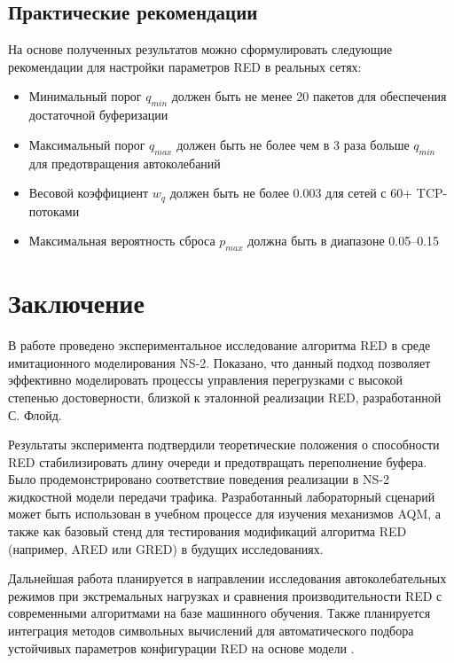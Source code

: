 \documentclass[10pt, conference, twocolumn, a4paper]{article}
\begin{document}
\subsection{Практические рекомендации}
На основе полученных результатов можно сформулировать следующие рекомендации для настройки параметров RED в реальных сетях:
\begin{itemize}
    \item Минимальный порог $q_{min}$ должен быть не менее 20 пакетов для обеспечения достаточной буферизации
    \item Максимальный порог $q_{max}$ должен быть не более чем в 3 раза больше $q_{min}$ для предотвращения автоколебаний
    \item Весовой коэффициент $w_q$ должен быть не более 0.003 для сетей с 60+ TCP-потоками
    \item Максимальная вероятность сброса $p_{max}$ должна быть в диапазоне 0.05--0.15
\end{itemize}

\section{Заключение}
В работе проведено экспериментальное исследование алгоритма RED в среде имитационного моделирования NS-2. Показано, что данный подход позволяет эффективно моделировать процессы управления перегрузками с высокой степенью достоверности, близкой к эталонной реализации RED, разработанной С. Флойд.

Результаты эксперимента подтвердили теоретические положения о способности RED стабилизировать длину очереди и предотвращать переполнение буфера. Было продемонстрировано соответствие поведения реализации в NS-2 жидкостной модели передачи трафика. Разработанный лабораторный сценарий может быть использован в учебном процессе для изучения механизмов AQM, а также как базовый стенд для тестирования модификаций алгоритма RED (например, ARED или GRED) в будущих исследованиях.

Дальнейшая работа планируется в направлении исследования автоколебательных режимов при экстремальных нагрузках и сравнения производительности RED с современными алгоритмами на базе машинного обучения. Также планируется интеграция методов символьных вычислений для автоматического подбора устойчивых параметров конфигурации RED на основе модели \cite{korolkova2010phd}.
\end{document}
